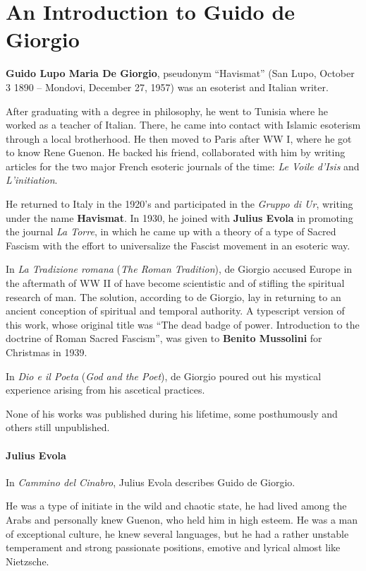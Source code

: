 \section{An Introduction to Guido de Giorgio}

\textbf{Guido Lupo Maria De Giorgio}, pseudonym ``Havismat'' (San Lupo, October 3 1890 -- Mondovi, December 27, 1957) was an esoterist and Italian writer.

After graduating with a degree in philosophy, he went to Tunisia where he worked as a teacher of Italian. There, he came into contact with Islamic esoterism through a local brotherhood. He then moved to Paris after WW I, where he got to know Rene Guenon. He backed his friend, collaborated with him by writing articles for the two major French esoteric journals of the time: \emph{Le Voile d'Isis} and \emph{L'initiation}.

He returned to Italy in the 1920's and participated in the \emph{Gruppo di Ur}, writing under the name \textbf{Havismat}. In 1930, he joined with \textbf{Julius Evola} in promoting the journal \emph{La Torre}, in which he came up with a theory of a type of Sacred Fascism with the effort to universalize the Fascist movement in an esoteric way.

In \emph{La Tradizione romana} (\emph{The Roman Tradition}), de Giorgio accused Europe in the aftermath of WW II of have become scientistic and of stifling the spiritual research of man. The solution, according to de Giorgio, lay in returning to an ancient conception of spiritual and temporal authority. A typescript version of this work, whose original title was ``The dead badge of power. Introduction to the doctrine of Roman Sacred Fascism'', was given to \textbf{Benito Mussolini} for Christmas in 1939.

In \emph{Dio e il Poeta} (\emph{God and the Poet}), de Giorgio poured out his mystical experience arising from his ascetical practices.

None of his works was published during his lifetime, some posthumously and others still unpublished.

\paragraph{Julius Evola}

In \emph{Cammino del Cinabro}, Julius Evola describes Guido de Giorgio.

\begin{quotex}
He was a type of initiate in the wild and chaotic state, he had lived among the Arabs and personally knew Guenon, who held him in high esteem. He was a man of exceptional culture, he knew several languages, but he had a rather unstable temperament and strong passionate positions, emotive and lyrical almost like Nietzsche.
\end{quotex}


